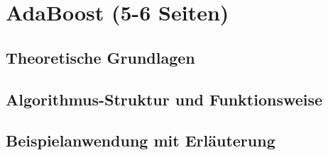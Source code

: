 \section{AdaBoost (5-6 Seiten)}
\subsection{Theoretische Grundlagen}
\subsection{Algorithmus-Struktur und Funktionsweise}
\subsection{Beispielanwendung mit Erläuterung}